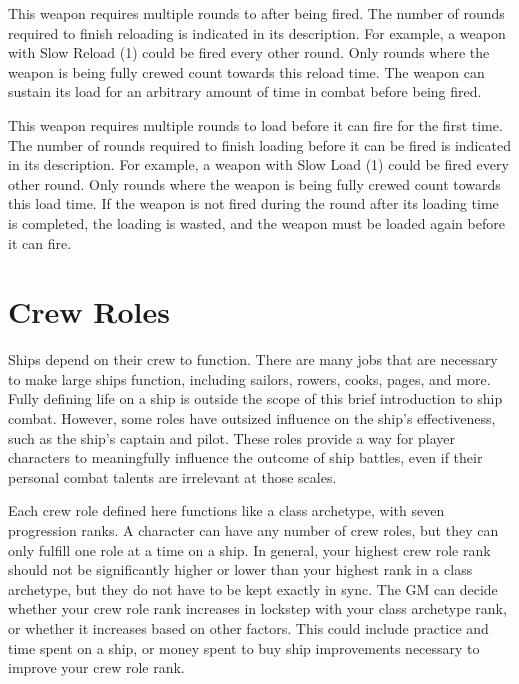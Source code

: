          This weapon requires multiple rounds to after being fired.
        The number of rounds required to finish reloading is indicated in its description.
        For example, a weapon with Slow Reload (1) could be fired every other round.
        Only rounds where the weapon is being fully crewed count towards this reload time.
        The weapon can sustain its load for an arbitrary amount of time in combat before being fired.

         This weapon requires multiple rounds to load before it can fire for the first time.
        The number of rounds required to finish loading before it can be fired is indicated in its description.
        For example, a weapon with Slow Load (1) could be fired every other round.
        Only rounds where the weapon is being fully crewed count towards this load time.
        If the weapon is not fired during the round after its loading time is completed, the loading is wasted, and the weapon must be loaded again before it can fire.

\section{Crew Roles}
    Ships depend on their crew to function.
    There are many jobs that are necessary to make large ships function, including sailors, rowers, cooks, pages, and more.
    Fully defining life on a ship is outside the scope of this brief introduction to ship combat.
    However, some roles have outsized influence on the ship's effectiveness, such as the ship's captain and pilot.
    These roles provide a way for player characters to meaningfully influence the outcome of ship battles, even if their personal combat talents are irrelevant at those scales.

    Each crew role defined here functions like a class archetype, with seven progression ranks.
    A character can have any number of crew roles, but they can only fulfill one role at a time on a ship.
    In general, your highest crew role rank should not be significantly higher or lower than your highest rank in a class archetype, but they do not have to be kept exactly in sync.
    The GM can decide whether your crew role rank increases in lockstep with your class archetype rank, or whether it increases based on other factors.
    This could include practice and time spent on a ship, or money spent to buy ship improvements necessary to improve your crew role rank.

